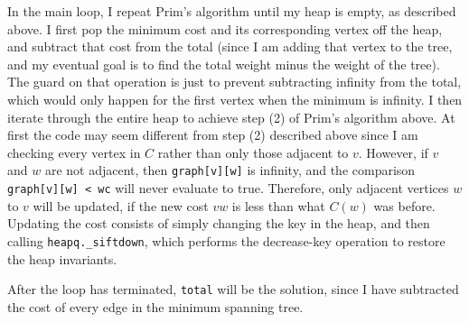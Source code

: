 \documentclass[11pt]{article}
\begin{document}
In the main loop, I repeat Prim's algorithm until my heap is empty, as described above. I first pop the minimum cost and its corresponding vertex off the heap, and subtract that cost from the total (since I am adding that vertex to the tree, and my eventual goal is to find the total weight minus the weight of the tree). The guard on that operation is just to prevent subtracting infinity from the total, which would only happen for the first vertex when the minimum is infinity. I then iterate through the entire heap to achieve step (2) of Prim's algorithm above. At first the code may seem different from step (2) described above since I am checking every vertex in $C$ rather than only those adjacent to $v$. However, if $v$ and $w$ are not adjacent, then \verb!graph[v][w]! is infinity, and the comparison \verb!graph[v][w] < wc! will never evaluate to true. Therefore, only adjacent vertices $w$ to $v$ will be updated, if the new cost $vw$ is less than what $C(w)$ was before. Updating the cost consists of simply changing the key in the heap, and then calling \verb!heapq._siftdown!, which performs the decrease-key operation to restore the heap invariants.

After the loop has terminated, \verb!total! will be the solution, since I have subtracted the cost of every edge in the minimum spanning tree.
\end{document}
